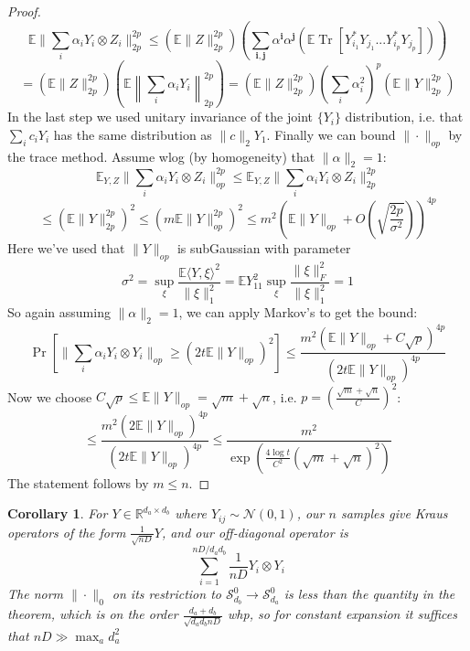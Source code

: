 \documentclass{article}
\newtheorem{corollary}[theorem]{Corollary}
\newcommand{\R}{{\mathbb{R}}}
\renewcommand{\vec}{\bm}
\newcommand{\E}{\mathbb{E}}
\newcommand\Sym{\mathcal{S}}
\newcommand\tr{\operatorname{Tr}}
\begin{document}
\begin{proof}
\[ \E \|\sum_{i} \alpha_{i} Y_{i} \otimes Z_{i}\|_{2p}^{2p}
\leq \left( \E \|Z\|_{2p}^{2p} \right) \left( \sum_{\vec{i},\vec{j}} \alpha^{\vec{i}} \alpha^{\vec{j}} (\E \tr [ Y_{i_{1}}^{*} Y_{j_{1}} ... Y_{i_{p}}^{*} Y_{j_{p}} ] ) \right) \]
\[ = \left( \E \|Z\|_{2p}^{2p} \right) \left( \E \left\| \sum_{i} \alpha_{i} Y_{i} \right\|_{2p}^{2p} \right)
= \left( \E \|Z\|_{2p}^{2p} \right) \left( \sum_{i} \alpha_{i}^{2} \right)^{p} \left( \E \|Y\|_{2p}^{2p} \right)    \]
In the last step we used unitary invariance of the joint $\{Y_{i}\}$ distribution, i.e. that $\sum_{i} c_{i} Y_{i}$ has the same distribution as $\|c\|_{2} Y_{1}$.
Finally we can bound $\|\cdot\|_{op}$ by the trace method. Assume wlog (by homogeneity) that $\|\alpha\|_{2} = 1$:
\[ \E_{Y, Z} \|\sum_{i} \alpha_{i} Y_{i} \otimes Z_{i} \|_{op}^{2p} \leq \E_{Y, Z} \|\sum_{i} \alpha_{i} Y_{i} \otimes Z_{i} \|_{2p}^{2p} \]
\[ \leq ( \E \|Y\|_{2p}^{2p} )^{2} \leq ( m \E \|Y\|_{op}^{2p} )^{2} \leq m^{2} \left(\E \|Y\|_{op} + O(\sqrt{\frac{2p}{\sigma^{2}}})  \right)^{4p} \]
Here we've used that $\|Y\|_{op}$ is subGaussian with parameter 
\[ \sigma^{2} = \sup_{\xi} \frac{ \E \langle Y, \xi \rangle^{2} }{\|\xi\|_{1}^{2}} = \E Y_{11}^{2} \sup_{\xi} \frac{ \|\xi\|_{F}^{2} }{\|\xi\|_{1}^{2} } = 1     \]
So again assuming $\|\alpha\|_{2} = 1$, we can apply Markov's to get the bound: 
\[ \Pr[\|\sum_{i} \alpha_{i} Y_{i} \otimes Y_{i}\|_{op} \geq (2t \E \|Y\|_{op})^{2} ] \leq    \frac{m^{2} (\E\|Y\|_{op} + C \sqrt{p} )^{4p}}{(2t \E\|Y\|_{op})^{4p}}    \]
Now we choose $C\sqrt{p} \leq \E \|Y\|_{op} = \sqrt{m} + \sqrt{n}$, i.e. $p = \left( \frac{\sqrt{m} + \sqrt{n}}{C} \right)^{2}$: 
\[ \leq \frac{m^{2} (2\E \|Y\|_{op})^{4p}}{(2t \E \|Y\|_{op})^{4p}} \leq \frac{m^{2}}{\exp(\frac{4 \log t}{C^{2}} (\sqrt{m} + \sqrt{n})^{2})}    \]
The statement follows by $m \leq n$. 
\end{proof}


\begin{corollary}
For $Y \in \R^{d_{a} \times d_{b}}$ where $Y_{ij} \sim \mathcal{N}(0,1)$, our $n$ samples give Kraus operators of the form $\frac{1}{\sqrt{nD}} Y$, and our off-diagonal operator is
\[ \sum_{i=1}^{nD/d_{a}d_{b}} \frac{1}{nD} Y_{i} \otimes Y_{i}   \]
The norm $\|\cdot\|_{0}$ on its restriction to $\Sym_{d_{b}}^{0} \to \Sym_{d_{a}}^{0}$ is less than the quantity in the theorem, which is on the order $\frac{d_{a}+d_{b}}{\sqrt{d_{a} d_{b} nD}}$ whp, so for constant expansion it suffices that $nD \gg \max_{a} d_{a}^{2}$
\end{corollary}
\end{document}
